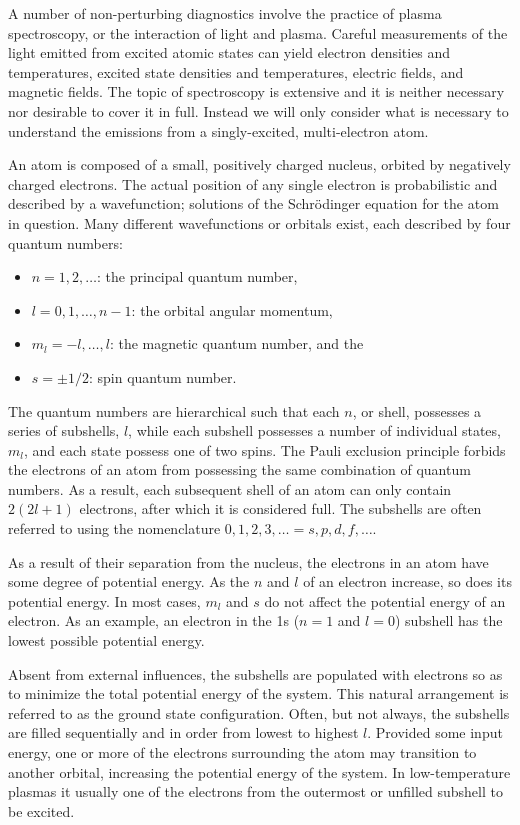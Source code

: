 {A number of non-perturbing diagnostics involve the practice of plasma
spectroscopy, or the interaction of light and plasma. Careful measurements of
the light emitted from excited atomic states can yield electron densities and
temperatures, excited state densities and temperatures, electric fields, and
magnetic fields. The topic of spectroscopy is extensive and it is neither
necessary nor desirable to cover it in full. Instead we will only consider what
is necessary to understand the emissions from a singly-excited, multi-electron
atom.

An atom is composed of a small, positively charged nucleus, orbited by
negatively charged electrons. The actual position of any single electron is
probabilistic and described by a wavefunction; solutions of the Schr\"{o}dinger
equation for the atom in question. Many different wavefunctions or orbitals
exist, each described by four quantum numbers:
\begin{itemize}
  \item $n=1,2,\ldots$: the principal quantum number,
  \item $l=0,1,\ldots,n-1$: the orbital angular momentum,
  \item $m_l =-l,\ldots,l$: the magnetic quantum number, and the
  \item $s=\pm1/2$: spin quantum number.
\end{itemize}
The quantum numbers are hierarchical such that each $n$, or shell, possesses a
series of subshells, $l$, while each subshell possesses a number of individual
states, $m_l$, and each state possess one of two spins. The Pauli exclusion
principle forbids the electrons of an atom from possessing the same combination
of quantum numbers. As a result, each subsequent shell of an atom can only
contain $2(2l+1)$ electrons, after which it is considered full. The subshells
are often referred to using the nomenclature $0,1,2,3,\ldots = s,p,d,f,\ldots$.

As a result of their separation from the nucleus, the electrons in an atom have
some degree of potential energy. As the $n$ and $l$ of an electron increase, so
does its potential energy. In most cases, $m_l$ and $s$ do not affect the
potential energy of an electron. As an example, an electron in the 1s ($n=1$ and
$l=0$) subshell has the lowest possible potential energy.

Absent from external influences, the subshells are populated with electrons so
as to minimize the total potential energy of the system. This natural
arrangement is referred to as the ground state configuration. Often, but not
always, the subshells are filled sequentially and in order from lowest to
highest $l$. Provided some input energy, one or more of the electrons
surrounding the atom may transition to another orbital, increasing the potential
energy of the system. In low-temperature plasmas it usually one of the electrons
from the outermost or unfilled subshell to be excited.

}
